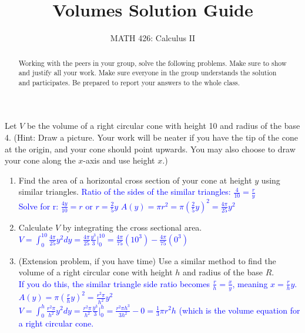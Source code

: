 \documentclass{ximera}
\title{Volumes Solution Guide}
\author{MATH 426: Calculus II}
\begin{document}
\begin{abstract}
   Working with the peers in your group, solve the following problems. Make sure to show and justify all your work. Make sure everyone in the group understands the solution and participates. Be prepared to report your answers to the whole class. 
\end{abstract}
\maketitle

\begin{exercise}
    Let $V$ be the volume of a right circular cone with height 10 and radius of the base 4.  (Hint: Draw a picture.  Your work will be neater if you have the tip of the cone at the origin, and your cone should point upwards.  You may also choose to draw your cone along the $x$-axis and use height $x$.)
    \begin{center}
    \end{center}
    \begin{enumerate}
        \item Find the area of a horizontal cross section of your cone at height $y$ using similar triangles.
        \textcolor{blue}{Ratio of the sides of the similar triangles: $\frac4{10}=\frac{r}{y}$ \\
        Solve for r: $\frac{4y}{10}=r$ or $r=\frac{2}{5}y$
        $A(y)=\pi r^2=\pi(\frac{2}{5}y)^2=\frac{4\pi}{25}y^2$}

        \item Calculate $V$ by integrating the cross sectional area. \\
        \textcolor{blue}{ $V=\displaystyle \int_0^{10} \frac{4\pi}{25}y^2dy=\frac{4\pi}{25}\frac{y^3}{3}\bigg|_0^{10}=\frac{4\pi}{75}(10^3)-\frac{4\pi}{75}(0^3)$}

        \item (Extension problem, if you have time) Use a similar method to find the volume of a right circular cone with height $h$ and radius of the base $R$.\\
        \textcolor{blue}{ If you do this, the similar triangle side ratio becomes $\frac{r}{h}=\frac{x}{y}$, meaning $x=\frac{r}{h}y$.\\
        $A(y)=\pi(\frac{r}{h}y)^2=\frac{r^2\pi}{h^2}y^2$\\
        $\displaystyle V=\int_0^h \frac{r^2\pi}{h^2}y^2dy=\frac{r^2\pi}{h^2}\frac{y^3}{3}\bigg|_0^h= \frac{r^2\pi h^3}{3h^2}-0=\frac13\pi r^2h $ (which is the volume equation for a right circular cone.}
    \end{enumerate}
\end{exercise}
\end{document}
